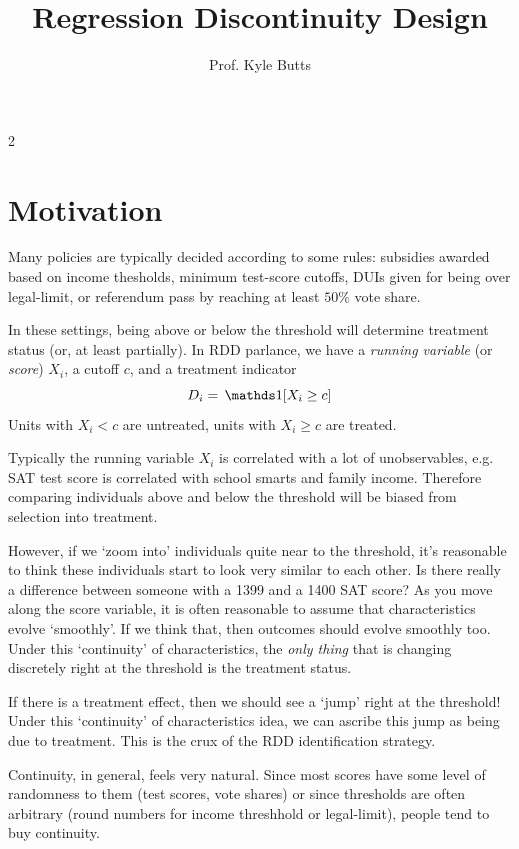 \documentclass[12pt]{article}
\title{Regression Discontinuity Design}
\author{Prof. Kyle Butts}
\date{}
\begin{document}
\maketitle
\begin{multicols}{2}

\section*{Motivation}

Many policies are typically decided according to some rules:
subsidies awarded based on income thesholds, minimum test-score cutoffs, DUIs given for being over legal-limit, or referendum pass by reaching at least $50\%$ vote share.

In these settings, being above or below the threshold will determine treatment status (or, at least partially).
In RDD parlance, we have a \emph{running variable} (or \emph{score}) $X_i$, a cutoff $c$, and a treatment indicator
$$
  D_i = \one{X_i \geq c}
$$
Units with $X_i < c$ are untreated, units with $X_i \geq c$ are treated.

Typically the running variable $X_i$ is correlated with a lot of unobservables, e.g. SAT test score is correlated with school smarts and family income.
Therefore comparing individuals above and below the threshold will be biased from selection into treatment. 

However, if we `zoom into' individuals quite near to the threshold, it's reasonable to think these individuals start to look very similar to each other. 
Is there really a difference between someone with a 1399 and a 1400 SAT score? 
As you move along the score variable, it is often reasonable to assume that characteristics evolve `smoothly'. 
If we think that, then outcomes should evolve smoothly too. 
Under this `continuity' of characteristics, the \emph{only thing} that is changing discretely right at the threshold is the treatment status.

If there is a treatment effect, then we should see a `jump' right at the threshold!
Under this `continuity' of characteristics idea, we can ascribe this jump as being due to treatment. 
This is the crux of the RDD identification strategy. 

Continuity, in general, feels very natural. 
Since most scores have some level of randomness to them (test scores, vote shares) or since thresholds are often arbitrary (round numbers for income threshhold or legal-limit), people tend to buy continuity.


\end{multicols}
\end{document}
